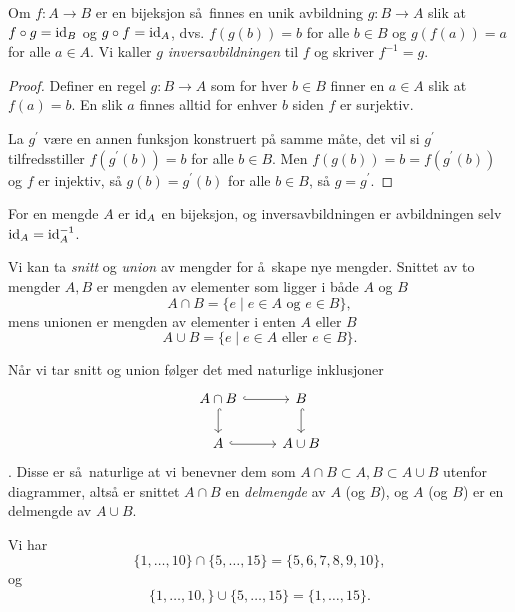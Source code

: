 \begin{lemma}\label{thm:set-inverse-function}
    Om $f\colon A\to B$ er en bijeksjon så finnes en unik avbildning
    $g\colon B\to A$ slik at $f\circ g = \operatorname{id}_B$ og $g\circ f = \operatorname{id}_A$,
    dvs.
    $f(g(b)) = b$ for alle $b\in B$ og $g(f(a)) = a$ for alle $a\in A$.
    Vi kaller $g$ \textit{inversavbildningen} til $f$ og skriver $f^{-1} = g$.
\end{lemma}
\begin{proof}
    Definer en regel $g\colon B\to A$ som for hver $b\in B$ finner en $a\in A$
    slik at $f(a) = b$.
    En slik $a$ finnes alltid for enhver $b$ siden $f$ er surjektiv.

    La $g^\prime$ være en annen funksjon konstruert på samme måte,
    det vil si $g^\prime$ tilfredsstiller $f(g^\prime(b)) = b$ for alle $b\in B$.
    Men $f(g(b)) = b = f(g^\prime(b))$ og $f$ er injektiv, så $g(b) = g^\prime(b)$
    for alle $b\in B$, så $g = g^\prime$.
\end{proof}

\begin{example}
    For en mengde $A$ er $\operatorname{id}_A$ en bijeksjon,
    og inversavbildningen er avbildningen selv $\operatorname{id}_A = \operatorname{id}_A^{-1}$.
\end{example}

\begin{example}
    Vi kan ta \textit{snitt} og \textit{union} av mengder for å skape nye mengder.
    Snittet av to mengder $A,B$ er mengden av elementer som ligger i både $A$ og $B$
    \[
        A\cap B = \{ e\mid e\in A\mbox{ og } e\in B\},
    \]
    mens unionen er mengden av elementer i enten $A$ eller $B$
    \[
        A\cup B = \{ e\mid e\in A\mbox{ eller } e\in B\}.
    \]

    Når vi tar snitt og union følger det med naturlige inklusjoner
    \[\begin{tikzcd}
        A\cap B
        \rar[hook]
        \dar[hook]
        & B
        \dar[hook]
        \\
        A
        \rar[hook]
        &
        A\cup B
    \end{tikzcd}\].
    Disse er så naturlige at vi benevner dem som $A\cap B\subset A,B\subset A\cup B$
    utenfor diagrammer, altså er snittet $A\cap B$
    en \textit{delmengde} av $A$ (og $B$),
    og $A$ (og $B$) er en delmengde av $A\cup B$.
\end{example}

\begin{example}
    Vi har
    \[
        \{1,\dots,10\}\cap \{5,\dots,15\} = \{5, 6, 7, 8, 9, 10\},
    \]
    og
    \[
        \{1,\dots, 10,\}\cup \{5,\dots, 15\} = \{1,\dots, 15\}.
    \]
\end{example}

